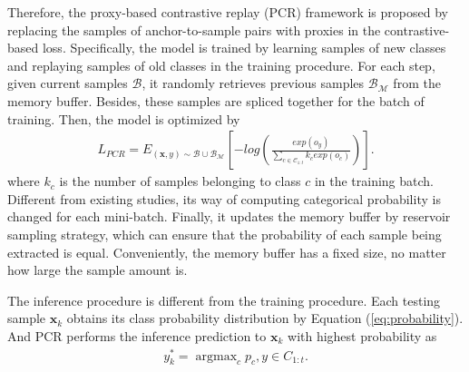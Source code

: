 Therefore, the proxy-based contrastive replay (PCR) framework is proposed by replacing the samples of anchor-to-sample pairs with proxies in the contrastive-based loss. Specifically, the model is trained by learning samples of new classes and replaying samples of old classes in the training procedure. For each step, given current samples $\mathcal{B}$, it randomly retrieves previous samples $\mathcal{B}_\mathcal{M}$ from the memory buffer. Besides, these samples are spliced together for the batch of training. Then, the model is optimized by  
\begin{equation}
    \label{eq:pcrloss}
\begin{split}
    L_{PCR}=E_{(\bm{x},y)\sim{\mathcal{B}\cup\mathcal{B}_\mathcal{M}}}[-log(\frac{exp(o_y)}{\sum_{c\in\mathcal{C}_{1:t}}k_c exp(o_c)})].
\end{split}
\end{equation}
where $k_c$ is the number of samples belonging to class $c$ in the training batch. Different from existing studies, its way of computing categorical probability is changed for each mini-batch. Finally, it updates the memory buffer by reservoir sampling strategy, which can ensure that the probability of each sample being extracted is equal. Conveniently, the memory buffer has a fixed size, no matter how large the sample amount is.

The inference procedure is different from the training procedure. Each testing sample $\bm{x}_k$ obtains its class probability distribution by Equation (\ref{eq:probability}). And PCR performs the inference prediction to $\bm{x}_k$ with highest probability as
\begin{equation}
 	\begin{split}
	 	y_k^* = \mathop{\arg\max}_{c}p_c,y\in C_{1:t}.
 	\end{split}
\end{equation}



